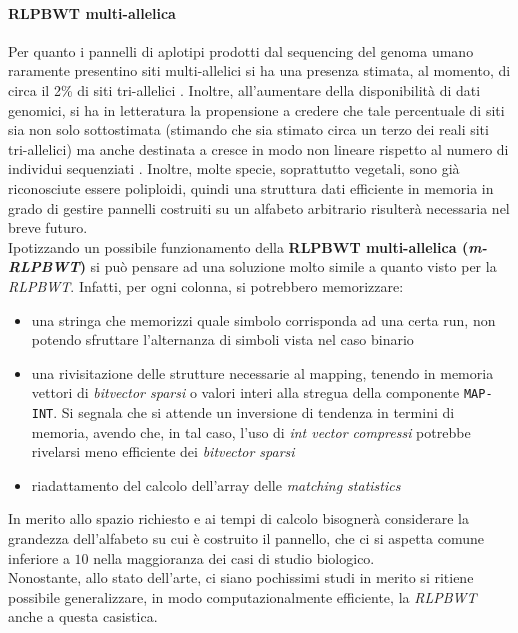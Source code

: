 \paragraph{RLPBWT multi-allelica}
Per quanto i pannelli di aplotipi prodotti dal sequencing del genoma umano
raramente presentino siti multi-allelici si ha una presenza stimata, al momento,
di circa il 2\% di siti tri-allelici \cite{tri}. Inoltre, all'aumentare della
disponibilità di dati genomici, si ha in letteratura la propensione a credere
che tale percentuale di siti sia non solo sottostimata (stimando che sia stimato
circa un terzo dei reali siti tri-allelici) ma anche destinata a
cresce in modo non lineare rispetto al numero di individui sequenziati
\cite{tri2}. Inoltre, molte specie, soprattutto vegetali, sono già riconosciute
essere poliploidi, quindi una struttura dati efficiente in memoria in grado di
gestire pannelli costruiti su un alfabeto arbitrario risulterà necessaria nel
breve futuro.\\
Ipotizzando un possibile funzionamento della \textbf{RLPBWT
  multi-allelica (\textit{m-RLPBWT})} si può pensare ad una soluzione molto
simile a quanto visto per la \textit{RLPBWT}. Infatti, per ogni colonna, si
potrebbero memorizzare:
\begin{itemize}
  \item una stringa che memorizzi quale simbolo corrisponda ad una certa run,
  non potendo sfruttare l'alternanza di simboli vista nel caso binario
  \item una rivisitazione delle strutture necessarie al mapping, tenendo in
  memoria vettori di \textit{bitvector sparsi} o valori interi alla stregua
  della componente \texttt{MAP-INT}. Si segnala che si attende un inversione di
  tendenza in termini di memoria, avendo che, in tal caso, l'uso di \textit{int
    vector compressi} potrebbe rivelarsi meno efficiente dei \textit{bitvector
    sparsi} 
  \item riadattamento del calcolo dell'array delle \textit{matching statistics}
\end{itemize}
In merito allo spazio richiesto e ai tempi di calcolo bisognerà considerare la
grandezza dell'alfabeto su cui è costruito il pannello, che ci si aspetta comune
inferiore a $10$ nella maggioranza dei casi di studio biologico.\\
Nonostante, allo stato dell'arte, ci siano pochissimi studi in merito si ritiene
possibile generalizzare, in modo computazionalmente efficiente, la
\textit{RLPBWT} anche a questa casistica. 
